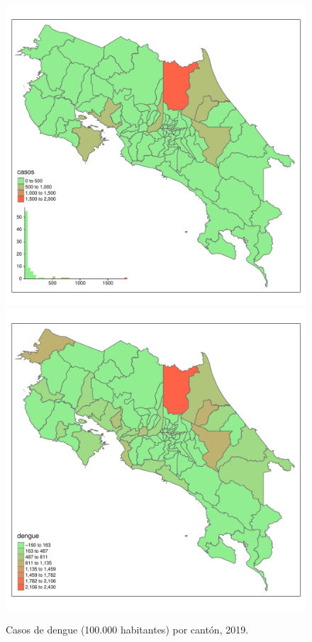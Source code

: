 \documentclass[12pt,a4paper]{article}
\begin{document}
\begin{figure}[hbtp]
\centering
\includegraphics[width=.48\textwidth]{FA1.pdf}
\includegraphics[width=.48\textwidth]{FA2.pdf}
\caption{Casos de dengue (100.000 habitantes) por cantón, 2019.}
\end{figure}
\end{document}
